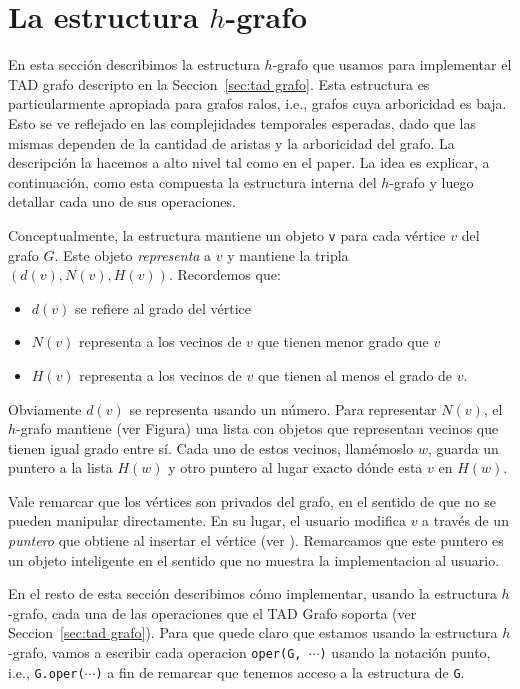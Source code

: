 \documentclass[a4paper,12pt]{article}
\begin{document}
\section{La estructura $h$-grafo}
\label{sec:h-grafo}

En esta sección describimos la estructura $h$-grafo que usamos para implementar el TAD grafo descripto en la Seccion~\ref{sec:tad grafo}.  Esta estructura es particularmente apropiada para grafos ralos, i.e., grafos cuya arboricidad es baja.  Esto se ve reflejado en  las complejidades temporales esperadas, dado que las mismas dependen de la cantidad de aristas y la arboricidad del grafo.  La descripción la hacemos a alto nivel tal como en el paper.  La idea es explicar, a continuación, como esta compuesta la estructura interna del $h$-grafo y luego detallar cada uno de sus operaciones.


Conceptualmente, la estructura mantiene un objeto \texttt{v} para cada vértice $v$ del grafo $G$.  Este objeto \emph{representa} a $v$ y mantiene la tripla $(d(v), N(v), H(v))$.  Recordemos que:   
\begin{itemize}
\item $d(v)$ se refiere al grado del vértice
\item $N(v)$ representa a los vecinos de $v$ que tienen menor grado que $v$
\item $H(v)$ representa a los vecinos de $v$ que tienen al menos el grado de $v$.
\end{itemize}

 Obviamente $d(v)$ se representa usando un número. Para representar $N(v)$, el $h$-grafo mantiene (ver Figura) una lista con objetos que representan vecinos que tienen igual grado entre sí. Cada uno de estos vecinos,   llamémoslo $w$,  guarda un puntero a la lista $H(w)$ y otro puntero al lugar exacto dónde esta $v$ en $H(w)$.

Vale remarcar que los vértices son privados del grafo, en el sentido de que no se pueden manipular directamente.  En su lugar, el usuario modifica $v$ a través de un \emph{puntero} que obtiene al insertar el vértice (ver ).  Remarcamos que este puntero es un objeto inteligente en el sentido que no muestra la implementacion al usuario.

En el resto de esta sección describimos cómo implementar, usando la estructura $h$-grafo, cada una de las operaciones que el TAD Grafo soporta (ver Seccion~\ref{sec:tad grafo}).  Para que quede claro que estamos usando la estructura $h$-grafo, vamos a escribir cada operacion \texttt{oper(G, $\cdots$)} usando la notación punto, i.e., \texttt{G.oper($\cdots$)} a fin de remarcar que tenemos acceso a la estructura de \texttt{G}.
\end{document}
